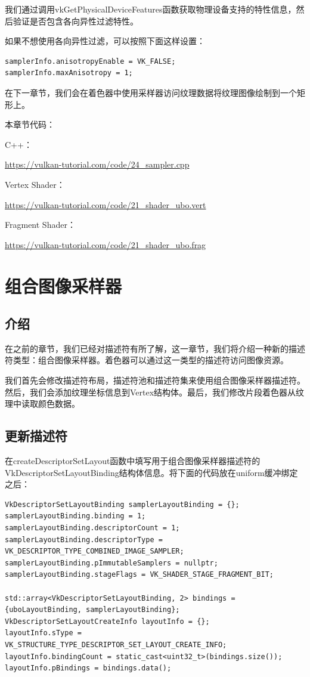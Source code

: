 \documentclass{ctexart}
\begin{document}
我们通过调用vkGetPhysicalDeviceFeatures函数获取物理设备支持的特性信息，然后验证是否包含各向异性过滤特性。

如果不想使用各向异性过滤，可以按照下面这样设置：

\begin{lstlisting}[language={[ANSI]C}]
samplerInfo.anisotropyEnable = VK_FALSE;
samplerInfo.maxAnisotropy = 1;
\end{lstlisting}

在下一章节，我们会在着色器中使用采样器访问纹理数据将纹理图像绘制到一个矩形上。

本章节代码：

C++：

\url{https://vulkan-tutorial.com/code/24_sampler.cpp}

Vertex Shader：

\url{https://vulkan-tutorial.com/code/21_shader_ubo.vert}

Fragment Shader：

\url{https://vulkan-tutorial.com/code/21_shader_ubo.frag}

\newpage
\section{组合图像采样器}

\subsection{介绍}

在之前的章节，我们已经对描述符有所了解，这一章节，我们将介绍一种新的描述符类型：组合图像采样器。着色器可以通过这一类型的描述符访问图像资源。

我们首先会修改描述符布局，描述符池和描述符集来使用组合图像采样器描述符。然后，我们会添加纹理坐标信息到Vertex结构体。最后，我们修改片段着色器从纹理中读取颜色数据。

\subsection{更新描述符}

在createDescriptorSetLayout函数中填写用于组合图像采样器描述符的VkDescriptorSetLayoutBinding结构体信息。将下面的代码放在uniform缓冲绑定之后：

\begin{lstlisting}[language={[ANSI]C}]
VkDescriptorSetLayoutBinding samplerLayoutBinding = {};
samplerLayoutBinding.binding = 1;
samplerLayoutBinding.descriptorCount = 1;
samplerLayoutBinding.descriptorType = VK_DESCRIPTOR_TYPE_COMBINED_IMAGE_SAMPLER;
samplerLayoutBinding.pImmutableSamplers = nullptr;
samplerLayoutBinding.stageFlags = VK_SHADER_STAGE_FRAGMENT_BIT;

std::array<VkDescriptorSetLayoutBinding, 2> bindings = {uboLayoutBinding, samplerLayoutBinding};
VkDescriptorSetLayoutCreateInfo layoutInfo = {};
layoutInfo.sType = VK_STRUCTURE_TYPE_DESCRIPTOR_SET_LAYOUT_CREATE_INFO;
layoutInfo.bindingCount = static_cast<uint32_t>(bindings.size());
layoutInfo.pBindings = bindings.data();
\end{lstlisting}
\end{document}
